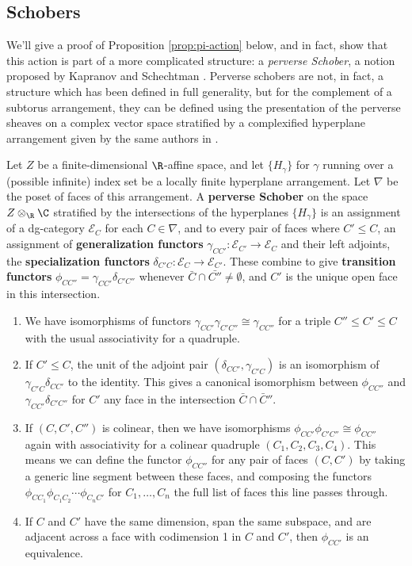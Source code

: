 \subsection{Schobers}
\label{sec:schobers}


We'll give a proof of Proposition \ref{prop:pi-action} below, and in fact, show that this action is part of a more complicated structure: a {\it perverse Schober}, a notion proposed by Kapranov and Schechtman \cite{KSschobers}.  Perverse schobers are not, in fact, a structure which has been defined in full generality, but for the complement of a subtorus arrangement, they can be defined using the presentation of the perverse sheaves on a complex vector space stratified by a complexified hyperplane arrangement given by the same authors in \cite{KShyperplane}.
\begin{definition}
  Let $Z$ be a finite-dimensional $\R$-affine space, and let $\{H_\gamma\}$ for $\gamma$ running over a (possible infinite) index set be a locally finite hyperplane arrangement.  Let $\nabla$ be the poset of faces of this arrangement.  A {\bf perverse Schober} on the space $Z\otimes_{\R}\C$ stratified by the intersections of the hyperplanes $\{H_\gamma\} $ is an assignment of a dg-category $\mathcal{E}_C$ for each $C\in \nabla$, and   to every pair of faces where $C'\leq C$, an assignment of 
  {\bf generalization functors} $\gamma_{CC'}:\mathcal{E}_{C'}\to \mathcal{E}_{C}$ and their left adjoints, the  {\bf specialization functors} $\delta_{C'C}\colon \mathcal{E}_{C}\to \mathcal{E}_{C'}$.  These combine to give {\bf transition functors} $\phi_{CC''}=\gamma_{CC'}\delta_{C'C''}$ whenever $\bar{C}\cap \bar{C''}\neq \emptyset$, and $C'$ is the unique open face in this intersection.
  \begin{enumerate}
  \item We have isomorphisms of functors $\gamma_{CC'}\gamma_{C'C''}\cong \gamma_{CC''}$  for a triple $C''\leq C'\leq C$ with the usual associativity for a quadruple.  
  \item If $C'\leq C$, the unit of the adjoint pair $(\delta_{CC'},\gamma_{C'C})$ is an isomorphism of  $\gamma_{C'C}\delta_{CC'}$ to the identity.  This gives a canonical isomorphism between $\phi_{CC''}$ and $\gamma_{CC'}\delta_{C'C''}$ for $C'$ any face in the intersection $\bar{C}\cap \bar{C}''$.  
  \item If $(C, C', C'')$ is colinear, then we have isomorphisms  $\phi_{CC'}\phi_{C'C''}\cong\phi_{CC''}$ again with associativity for a colinear quadruple $(C_1,C_2,C_3,C_4)$.  This means we can define the functor $\phi_{CC''}$ for any pair of faces $(C,C')$ by taking a generic line segment between these faces, and composing the functors $\phi_{CC_1}\phi_{C_1C_2}\cdots \phi_{C_nC'}$ for $C_1,\dots, C_n$ the full list of faces this line passes through.  
  \item If $C$ and $C'$ have the same dimension, span the same subspace, and are adjacent across a face with codimension 1 in $C$ and $C'$, then $\phi_{CC'}$ is an equivalence. 
  \end{enumerate}
\end{definition}

